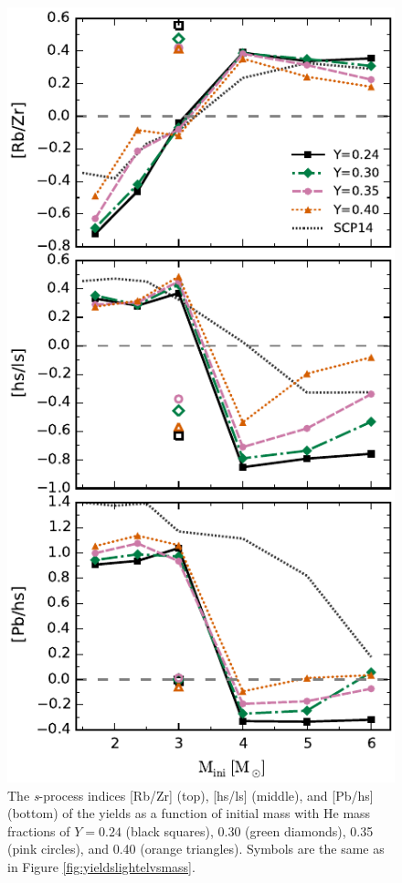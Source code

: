 \begin{figure}
 \begin{center}\includegraphics[height=0.82\textheight]{fig-yieldlshspbvsmass.pdf}\end{center}
 \caption{The \textit{s}-process indices [Rb/Zr] (top), [hs/ls] (middle), and [Pb/hs] (bottom) of the yields as a function of initial mass with He mass fractions of $Y= 0.24$ (black squares), 0.30 (green diamonds), 0.35 (pink circles), and 0.40 (orange triangles). Symbols are the same as in Figure \ref{fig:yieldslightelvsmass}.}\label{fig:yieldlshspbvsmass}
\end{figure}

